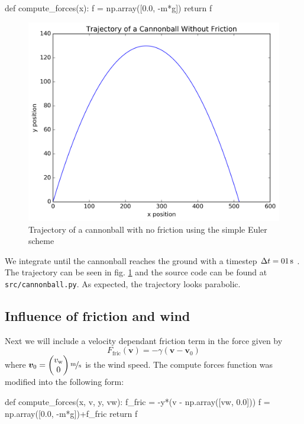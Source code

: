 \documentclass[a4paper,11pt,bibtotoc]{scrartcl}
\begin{document}
\begin{python}
def compute_forces(x):
    f = np.array([0.0, -m*g])
    return f
\end{python}

\begin{figure}[h]
  \includegraphics[width=0.7\linewidth]{../fig/cannonball1.png}
  \centering
  \caption{Trajectory of a cannonball with no friction using the
    simple Euler scheme}
  \label{fig:cannonball1}
\end{figure}

We integrate until the cannonball reaches the ground with a timestep
$\Delta t = \unit[01]{s}$ . The trajectory can be seen in
fig. \ref{fig:cannonball1} and the source code can be found at
\texttt{src/cannonball.py}. As expected, the trajectory looks parabolic.


\subsection{Influence of friction and wind}

Next we will include a velocity dependant friction term in the force
given by
\begin{equation}
  F_\mathrm{fric}(\bm{v}) = -\gamma(\bm{v}-\bm{v}_0)
\end{equation}
where
$\bm{v}_0 = \begin{pmatrix}v_\mathrm{w} \\ 0 \end{pmatrix}
\unitfrac{m}{s}$ is the wind speed.  The compute forces function was
modified into the following form:

\begin{python}
def compute_forces(x, v, y, vw):
    f_fric = -y*(v - np.array([vw, 0.0]))
    f = np.array([0.0, -m*g])+f_fric
    return f
\end{python}
\end{document}
